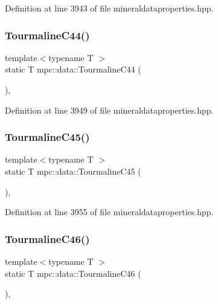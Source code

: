 Definition at line 3943 of file mineraldataproperties.\+hpp.

\mbox{\label{namespacempc_1_1data_a7ced95807420aa278d9c046666fbd628}} 
\subsubsection{\texorpdfstring{Tourmaline\+C44()}{TourmalineC44()}}
{\footnotesize\ttfamily template$<$typename T $>$ \\
static T mpc\+::data\+::\+Tourmaline\+C44 (\begin{DoxyParamCaption}{ }\end{DoxyParamCaption})\hspace{0.3cm}{\ttfamily [inline]}, {\ttfamily [static]}}



Definition at line 3949 of file mineraldataproperties.\+hpp.

\mbox{\label{namespacempc_1_1data_a7612c1ad1af1a2429072cf78044f5f6f}} 
\subsubsection{\texorpdfstring{Tourmaline\+C45()}{TourmalineC45()}}
{\footnotesize\ttfamily template$<$typename T $>$ \\
static T mpc\+::data\+::\+Tourmaline\+C45 (\begin{DoxyParamCaption}{ }\end{DoxyParamCaption})\hspace{0.3cm}{\ttfamily [inline]}, {\ttfamily [static]}}



Definition at line 3955 of file mineraldataproperties.\+hpp.

\mbox{\label{namespacempc_1_1data_a00018020626f4720703fa5ad83d6ab75}} 
\subsubsection{\texorpdfstring{Tourmaline\+C46()}{TourmalineC46()}}
{\footnotesize\ttfamily template$<$typename T $>$ \\
static T mpc\+::data\+::\+Tourmaline\+C46 (\begin{DoxyParamCaption}{ }\end{DoxyParamCaption})\hspace{0.3cm}{\ttfamily [inline]}, {\ttfamily [static]}}



